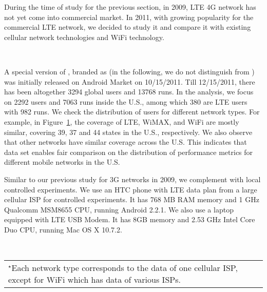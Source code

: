 \label{sec:net.lte}

During the time of study for the previous section, \ie in 2009, LTE 4G network has not yet come into commercial market. In 2011, with growing popularity for the commercial LTE network, we decided to study it and compare it with existing cellular network technologies and WiFi technology.

\begin{figure}[t]
\centering
{} \\
\label{fig:net.gps}
\end{figure}

A special version of \mobiperf, branded as \FT (in the following, we do not distinguish \FT from \mobiperf) was initially released on Android Market on 10/15/2011. Till 12/15/2011, there has been altogether 3294 global users and 13768 runs. In the analysis, we focus on 2292 users and 7063 runs inside the U.S., among which 380 are LTE users with 982 runs. We check the distribution of \mobiperf users for different network types. For example, in Figure~\ref{fig:net.gps}, the coverage of LTE, WiMAX, and WiFi are mostly similar, covering 39, 37 and 44 states in the U.S., respectively. We also observe that other networks have similar coverage across the U.S. This indicates that \mobiperf data set enables fair comparison on the distribution of performance metrics for different mobile networks in the U.S. 

Similar to our previous study for 3G networks in 2009, we complement \mobiperf with local controlled experiments.
We use an HTC phone with LTE data plan from a large cellular ISP for controlled experiments. It has 768 MB RAM memory and 1 GHz Qualcomm MSM8655 CPU, running Android 2.2.1. We also use a laptop equipped with LTE USB Modem. It has 8GB memory and 2.53 GHz Intel Core Duo CPU, running Mac OS X 10.7.2.

\label{sec:net.4gtest}

\begin{figure*}[t]
\centering
{} \\
\label{fig:net.4gtest}
\begin{tabular}{l}
\\{\footnotesize $^\star$Each network type corresponds to the data of one cellular ISP, except for WiFi which has data of various ISPs.}
\end{tabular}
\end{figure*}


